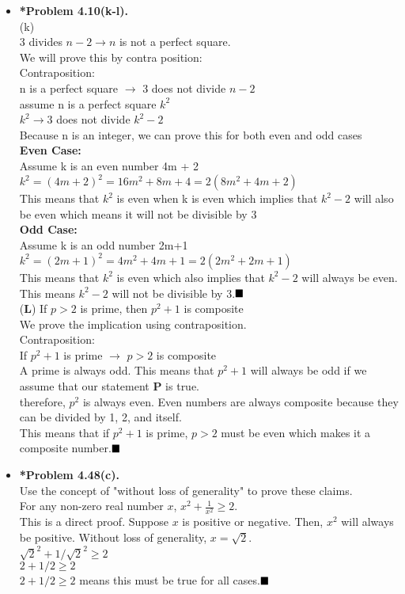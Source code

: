 \documentclass[11pt]{article}
\def\imp{\rightarrow}
\begin{document}
\begin{itemize}
\item \textbf{*Problem 4.10(k-l).} 
\\(k)
\\$3$ divides $n-2 \imp n$ is not a perfect square.
\\We will prove this by contra position:
\\Contraposition:
\\n is a perfect square $\rightarrow$ 3 does not divide $n-2$
\\assume n is a perfect square $k^2$
\\$k^2 \rightarrow$3 does not divide $k^2 - 2$
\\Because n is an integer, we can prove this for both even and odd cases
\\\textbf{Even Case:}
\\Assume k is an even number 4m + 2
\\$k^2=(4m+2)^2=16m^2+8m+4=2(8m^2+4m+2)$
\\This means that $k^2$ is even when k is even which implies that $k^2 - 2$ will also be even which means it will not be divisible by 3
\\\textbf{Odd Case:}
\\Assume k is an odd number 2m+1
\\$k^2=(2m+1)^2=4m^2+4m+1=2(2m^2+2m+1)$
\\This means that $k^2$ is even which also implies that $k^2 - 2$ will always be even. This means $k^2 - 2$ will not be divisible by 3.$\hfill{\blacksquare}$
\\(\textbf{L})
If $p > 2$ is prime, then $p^2+1$ is composite
\\We prove the implication using contraposition.
\\Contraposition:
\\If $p^2 + 1$ is prime $\imp$ $p > 2$ is composite
\\A prime is always odd. This means that $p^2 + 1$ will always be odd if we assume that our statement \textbf{P} is true.
\\therefore, $p^2$ is always even. Even numbers are always composite because they can be divided by 1, 2, and itself.
\\This means that if $p^2 + 1$ is prime, $p > 2$ must be even which makes it a composite number.$\hfill{\blacksquare}$

\vspace{0.1in}

\item \textbf{*Problem 4.48(c).} 
\\Use the concept of "without loss of generality" to prove these claims.
\\For any non-zero real number $x$, $x^2+\frac{1}{x^2} \ge 2$.
\\This is a direct proof. Suppose $x$ is positive or negative. Then, $x^2$ will always be positive. 
Without loss of generality, $x=\sqrt{2}$.
\\$\sqrt{2}^2 + 1/\sqrt{2}^2 \ge 2$
\\$2 + 1/2 \ge 2$
\\$2 + 1/2 \ge 2$ means this must be true for all cases.$\hfill\blacksquare$


\end{itemize}
\end{document}
